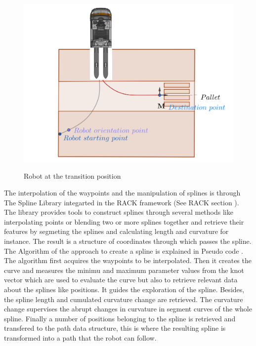 \begin{figure}[H]
    \begin{center}
        \includegraphics[width=5in]{images/Chap2/truck_transition.png}\\
        \caption{Robot at the transition position}
        \label{transition}
        \end{center}    
\end{figure}

The interpolation of the waypoints and the manipulation of splines is through The Spline Library integarted in 
the RACK framework (See RACK section%
). The library provides tools to construct splines through several methods like interpolating points or blending two or more splines 
together and retrieve their features by segmeting the splines and calculating length and curvature for instance.
The result is a structure of coordinates through which passes the spline. 
The Algorithm of the approach to create a spline is explained in Pseudo code .
The algorithm first acquires the waypoints to be interpolated. Then it creates the curve 
and measures the minimu and maximum parameter values from the knot vector which are used to evaluate 
the curve but also to retrieve relevant data about the splines like positions. It guides the exploration
of the spline. Besides, the spline length and cumulated curvature change are retrieved. 
The curvature change supervises the abrupt changes in curvature in segment curves of the whole spline.
Finally a number of positions belonging to the spline is retrieved and transfered to the path data structure,
this is where the resulting spline is transformed into a path that the robot can follow.


